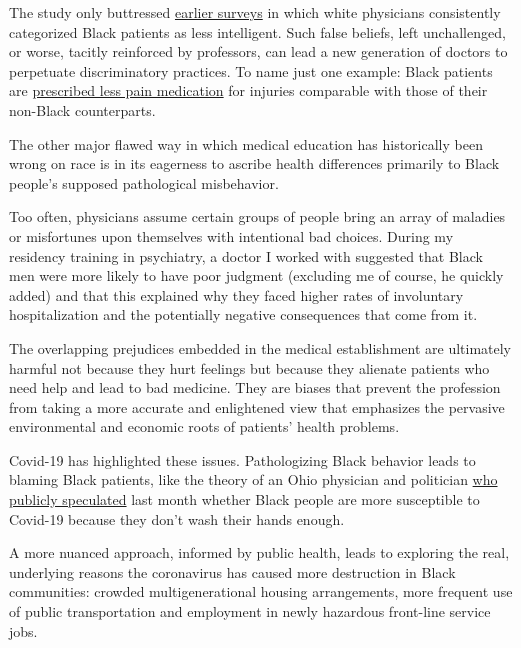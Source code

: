 The study only buttressed
\href{https://www.sciencedirect.com/science/article/abs/pii/S027795369900338X\#:~:text=Socioeconomic\%20status\%20moderates\%20the\%20relationship,pleasant\%20and\%20rational\%20than\%20Whites.}{earlier
surveys} in which white physicians consistently categorized Black
patients as less intelligent. Such false beliefs, left unchallenged, or
worse, tacitly reinforced by professors, can lead a new generation of
doctors to perpetuate discriminatory practices. To name just one
example: Black patients are
\href{https://journalofethics.ama-assn.org/article/pain-and-ethnicity/2013-05}{prescribed
less pain medication} for injuries comparable with those of their
non-Black counterparts.

The other major flawed way in which medical education has historically
been wrong on race is in its eagerness to ascribe health differences
primarily to Black people's supposed pathological misbehavior.

Too often, physicians assume certain groups of people bring an array of
maladies or misfortunes upon themselves with intentional bad choices.
During my residency training in psychiatry, a doctor I worked with
suggested that Black men were more likely to have poor judgment
(excluding me of course, he quickly added) and that this explained why
they faced higher rates of involuntary hospitalization and the
potentially negative consequences that come from it.

The overlapping prejudices embedded in the medical establishment are
ultimately harmful not because they hurt feelings but because they
alienate patients who need help and lead to bad medicine. They are
biases that prevent the profession from taking a more accurate and
enlightened view that emphasizes the pervasive environmental and
economic roots of patients' health problems.

Covid-19 has highlighted these issues. Pathologizing Black behavior
leads to blaming Black patients, like the theory of an Ohio physician
and politician
\href{https://www.washingtonpost.com/nation/2020/06/11/black-coronavirus-ohio-gop/}{who
publicly speculated} last month whether Black people are more
susceptible to Covid-19 because they don't wash their hands enough.

A more nuanced approach, informed by public health, leads to exploring
the real, underlying reasons the coronavirus has caused more destruction
in Black communities: crowded multigenerational housing arrangements,
more frequent use of public transportation and employment in newly
hazardous front-line service jobs.

